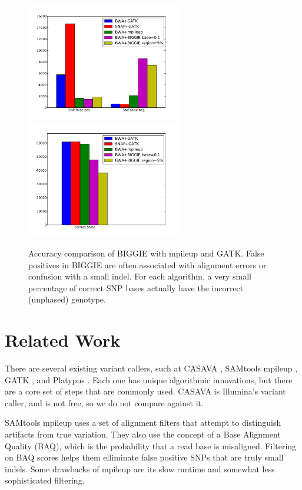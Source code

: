 \documentclass[10pt]{article}
\begin{document}
\begin{figure}[h!]
	\includegraphics[width=2.7in]{figs/variant_call_results_all.pdf} \hspace{5mm}
	\includegraphics[width=2.7in]{figs/correct_results_all.pdf}
	\caption{Accuracy comparison of BIGGIE with mpileup and GATK. False positives in BIGGIE are often associated with alignment errors or confusion with a small indel. For each algorithm, a very small percentage of correct SNP bases actually have the incorrect (unphased) genotype.} %
	\end{figure}


\section{Related Work}
\label{sec:relatedWork}

There are several existing variant callers, such at CASAVA \cite{casava}, SAMtools mpileup \cite{samtools}, GATK \cite{gatk}, and Platypus \cite{platypus}. Each one has unique algorithmic innovations, but there are a core set of steps that are commonly used. CASAVA is Illumina's variant caller, and is not free, so we do not compare against it.

SAMtools mpileup uses a set of alignment filters that attempt to distinguish artifacts from true variation. They also use the concept of a Base Alignment Quality (BAQ), which is the probability that a read base is misaligned. Filtering on BAQ scores helps them elliminate false positive SNPs that are truly small indels. Some drawbacks of mpileup are its slow runtime and somewhat less sophisticated filtering.
\end{document}
